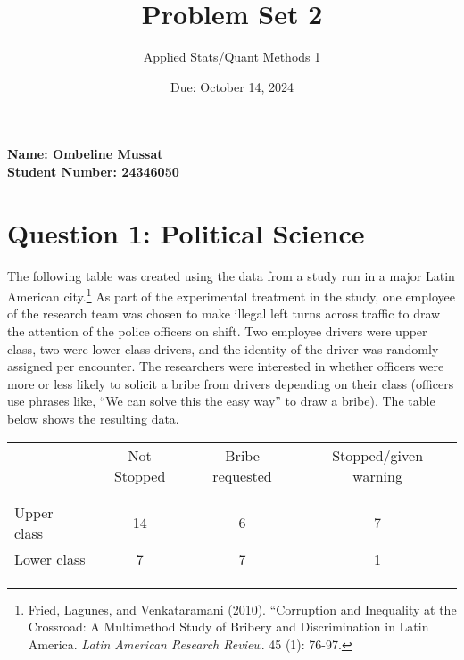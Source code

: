 \documentclass[12pt,letterpaper]{article}
\title{Problem Set 2}
\date{Due: October 14, 2024}
\author{Applied Stats/Quant Methods 1}
\begin{document}
	\maketitle
	\vspace{-2em} 
	\noindent \textbf{Name: Ombeline Mussat} \\
	\noindent \textbf{Student Number: 24346050} \\
	\vspace{1cm}
	

	\section*{Question 1: Political Science}
		\vspace{.25cm}
	The following table was created using the data from a study run in a major Latin American city.\footnote{Fried, Lagunes, and Venkataramani (2010). ``Corruption and Inequality at the Crossroad: A Multimethod Study of Bribery and Discrimination in Latin America. \textit{Latin American Research Review}. 45 (1): 76-97.} As part of the experimental treatment in the study, one employee of the research team was chosen to make illegal left turns across traffic to draw the attention of the police officers on shift. Two employee drivers were upper class, two were lower class drivers, and the identity of the driver was randomly assigned per encounter. The researchers were interested in whether officers were more or less likely to solicit a bribe from drivers depending on their class (officers use phrases like, ``We can solve this the easy way'' to draw a bribe). The table below shows the resulting data.


\begin{table}[h!]
	\centering
	\begin{tabular}{l | c c c }
		& Not Stopped & Bribe requested & Stopped/given warning \\
		\\[-1.8ex] 
		\hline \\[-1.8ex]
		Upper class & 14 & 6 & 7 \\
		Lower class & 7 & 7 & 1 \\
		\hline
	\end{tabular}
\end{table}

\newpage
\end{document}
